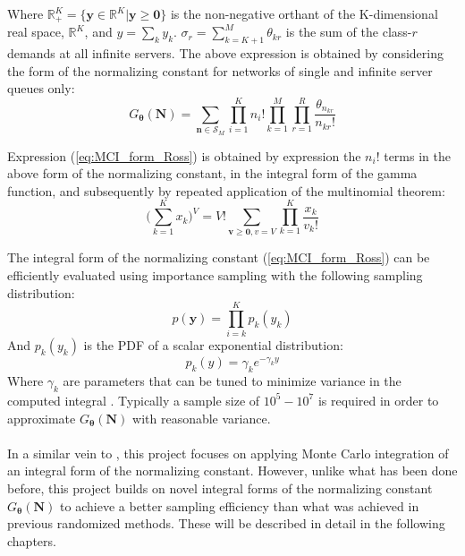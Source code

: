 Where \(\mathbb{R}_+^K = \{ \mathbf{y} \in \mathbb{R}^K | \mathbf{y \geq 0}\} \) is the non-negative orthant of the K-dimensional real space, \(\mathbb{R}^K\), and \(y = \sum_k y_k\). \(\sigma_r = \sum_{k=K+1}^M \theta_{kr}\) is the sum of the class-\(r\) demands at all infinite servers. The above expression is obtained by considering the form of the normalizing constant for networks of single and infinite server queues only:
\begin{equation*}
    G_{\boldsymbol{\theta}}(\mathbf{N}) = \sum_{\mathbf{n} \in \mathcal{S}_M} \prod_{i=1}^K n_i! \prod_{k=1}^M \prod_{r=1}^R \frac{\theta_{n_{kr}}}{n_{kr}!}
\end{equation*}

Expression (\ref{eq:MCI_form_Ross}) is obtained by expression the \(n_i!\) terms in the above form of the normalizing constant, in the integral form of the gamma function, and subsequently by repeated application of the multinomial theorem:
\begin{equation*}
    \bigg( \sum_{k=1}^K x_k \bigg)^V = V! \sum_{\mathbf{v \geq 0}, v=V} \prod_{k=1}^K \frac{x_k}{v_k!}
\end{equation*}

The integral form of the normalizing constant (\ref{eq:MCI_form_Ross}) can be efficiently evaluated using importance sampling with the following sampling distribution:
\[p(\mathbf{y}) = \prod_{i=k}^K p_k(y_k)\]
And \(p_k(y_k)\) is the PDF of a scalar exponential distribution:
\[p_k(y) = \gamma_k e^{-\gamma_k y}\]
Where \(\gamma_k\) are parameters that can be tuned to minimize variance in the computed integral \cite{Ross1994MonteNetworks}. Typically a sample size of \(10^5-10^7\) is required in order to approximate \(G_{\boldsymbol{\theta}}(\mathbf{N})\) with reasonable variance. 
\\\\
In a similar vein to \cite{Ross1994MonteNetworks}, this project focuses on applying Monte Carlo integration of an integral form of the normalizing constant. However, unlike what has been done before, this project builds on novel integral forms of the normalizing constant \(G_{\boldsymbol{\theta}}(\mathbf{N})\) to achieve a better sampling efficiency than what was achieved in previous randomized methods. These will be described in detail in the following chapters.
